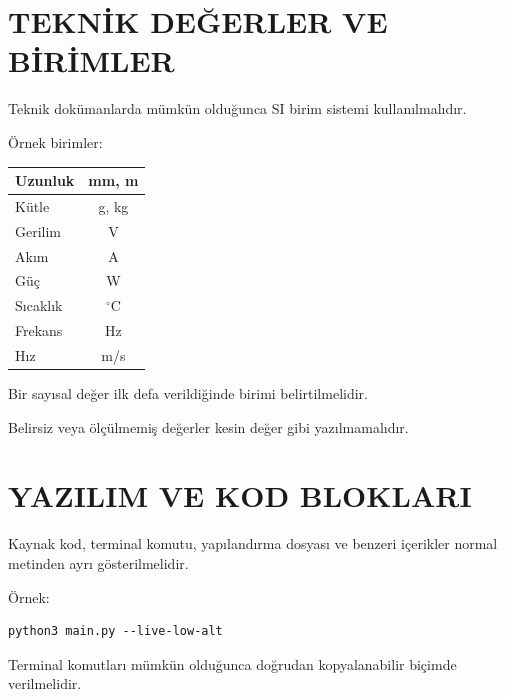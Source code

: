 \documentclass[11pt,a4paper]{article}
\begin{document}

\newpage

\section{TEKNİK DEĞERLER VE BİRİMLER}

Teknik dokümanlarda mümkün olduğunca SI birim sistemi kullanılmalıdır.

Örnek birimler:

\begin{center}

\begin{tabular}{|l|c|}
\hline
Uzunluk & mm, m \\
\hline
Kütle & g, kg \\
\hline
Gerilim & V \\
\hline
Akım & A \\
\hline
Güç & W \\
\hline
Sıcaklık & $^\circ$C \\
\hline
Frekans & Hz \\
\hline
Hız & m/s \\
\hline
\end{tabular}

\end{center}

Bir sayısal değer ilk defa verildiğinde birimi belirtilmelidir.

Belirsiz veya ölçülmemiş değerler kesin değer gibi yazılmamalıdır.


\newpage

\section{YAZILIM VE KOD BLOKLARI}

Kaynak kod,
terminal komutu,
yapılandırma dosyası
ve benzeri içerikler normal metinden ayrı gösterilmelidir.

Örnek:

\begin{lstlisting}
python3 main.py --live-low-alt
\end{lstlisting}

Terminal komutları mümkün olduğunca doğrudan kopyalanabilir biçimde
verilmelidir.
\end{document}
